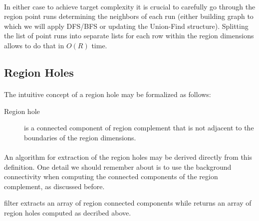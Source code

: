 \paragraph*{}
In either case to achieve target complexity it is crucial to carefully go through the region point runs determining the neighbors of each run (either building graph to which we will apply DFS/BFS or updating the Union-Find structure). Splitting the list of point runs into separate lists for each row within the region dimensions allows to do that in $O(R)$ time.

\subsection{Region Holes}

\paragraph*{}
The intuitive concept of a region hole may be formalized as follows:

\begin{description}
	\item[Region hole] is a connected component of region complement that is not adjacent to the boundaries of the region dimensions.
\end{description}

\paragraph*{}
An algorithm for extraction of the region holes may be derived directly from this definition. One detail we should remember about is to use the background connectivity when computing the connected components of the region complement, as discussed before. 

\begin{refImpl}
\studio filter  extracts an array of region connected components while  returns an array of region holes computed as decribed above.
\end{refImpl}